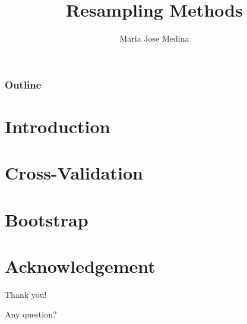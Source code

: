 \documentclass[10pt]{beamer}
\title{Resampling Methods}%
\author[Maria Jose Medina]{Maria Jose Medina}%
\institute[USACH]{Universidad de Santiago de Chile}
\date[\textcolor{white}{September 2022}]
\begin{document}
\frame{\titlepage}
\begin{frame}
\frametitle{Outline}
\tableofcontents
\end{frame}



\section{Introduction}



\section{Cross-Validation}


\section{Bootstrap}





\section*{Acknowledgement}  
\begin{frame}

\textcolor{myNewColorA}{\huge{\centerline{Thank you!}}}
\vspace*{0.5cm}

\textcolor{myNewColorA}{\Large{\centerline{Any question?}}}
\vspace*{0.5cm}


\end{frame}
\end{document}
